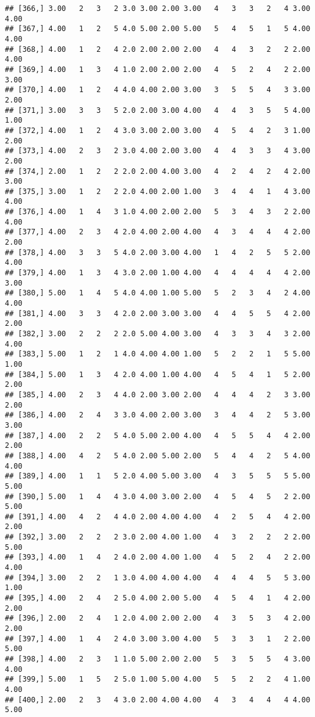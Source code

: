 \documentclass[]{article}
\begin{document}
\begin{verbatim}
## [366,] 3.00   2   3   2 3.0 3.00 2.00 3.00   4   3   3   2   4 3.00 4.00
## [367,] 4.00   1   2   5 4.0 5.00 2.00 5.00   5   4   5   1   5 4.00 4.00
## [368,] 4.00   1   2   4 2.0 2.00 2.00 2.00   4   4   3   2   2 2.00 4.00
## [369,] 4.00   1   3   4 1.0 2.00 2.00 2.00   4   5   2   4   2 2.00 3.00
## [370,] 4.00   1   2   4 4.0 4.00 2.00 3.00   3   5   5   4   3 3.00 2.00
## [371,] 3.00   3   3   5 2.0 2.00 3.00 4.00   4   4   3   5   5 4.00 1.00
## [372,] 4.00   1   2   4 3.0 3.00 2.00 3.00   4   5   4   2   3 1.00 2.00
## [373,] 4.00   2   3   2 3.0 4.00 2.00 3.00   4   4   3   3   4 3.00 2.00
## [374,] 2.00   1   2   2 2.0 2.00 4.00 3.00   4   2   4   2   4 2.00 3.00
## [375,] 3.00   1   2   2 2.0 4.00 2.00 1.00   3   4   4   1   4 3.00 4.00
## [376,] 4.00   1   4   3 1.0 4.00 2.00 2.00   5   3   4   3   2 2.00 4.00
## [377,] 4.00   2   3   4 2.0 4.00 2.00 4.00   4   3   4   4   4 2.00 2.00
## [378,] 4.00   3   3   5 4.0 2.00 3.00 4.00   1   4   2   5   5 2.00 4.00
## [379,] 4.00   1   3   4 3.0 2.00 1.00 4.00   4   4   4   4   4 2.00 3.00
## [380,] 5.00   1   4   5 4.0 4.00 1.00 5.00   5   2   3   4   2 4.00 4.00
## [381,] 4.00   3   3   4 2.0 2.00 3.00 3.00   4   4   5   5   4 2.00 2.00
## [382,] 3.00   2   2   2 2.0 5.00 4.00 3.00   4   3   3   4   3 2.00 4.00
## [383,] 5.00   1   2   1 4.0 4.00 4.00 1.00   5   2   2   1   5 5.00 1.00
## [384,] 5.00   1   3   4 2.0 4.00 1.00 4.00   4   5   4   1   5 2.00 2.00
## [385,] 4.00   2   3   4 4.0 2.00 3.00 2.00   4   4   4   2   3 3.00 2.00
## [386,] 4.00   2   4   3 3.0 4.00 2.00 3.00   3   4   4   2   5 3.00 3.00
## [387,] 4.00   2   2   5 4.0 5.00 2.00 4.00   4   5   5   4   4 2.00 2.00
## [388,] 4.00   4   2   5 4.0 2.00 5.00 2.00   5   4   4   2   5 4.00 4.00
## [389,] 4.00   1   1   5 2.0 4.00 5.00 3.00   4   3   5   5   5 5.00 5.00
## [390,] 5.00   1   4   4 3.0 4.00 3.00 2.00   4   5   4   5   2 2.00 5.00
## [391,] 4.00   4   2   4 4.0 2.00 4.00 4.00   4   2   5   4   4 2.00 2.00
## [392,] 3.00   2   2   2 3.0 2.00 4.00 1.00   4   3   2   2   2 2.00 5.00
## [393,] 4.00   1   4   2 4.0 2.00 4.00 1.00   4   5   2   4   2 2.00 4.00
## [394,] 3.00   2   2   1 3.0 4.00 4.00 4.00   4   4   4   5   5 3.00 1.00
## [395,] 4.00   2   4   2 5.0 4.00 2.00 5.00   4   5   4   1   4 2.00 2.00
## [396,] 2.00   2   4   1 2.0 4.00 2.00 2.00   4   3   5   3   4 2.00 2.00
## [397,] 4.00   1   4   2 4.0 3.00 3.00 4.00   5   3   3   1   2 2.00 5.00
## [398,] 4.00   2   3   1 1.0 5.00 2.00 2.00   5   3   5   5   4 3.00 4.00
## [399,] 5.00   1   5   2 5.0 1.00 5.00 4.00   5   5   2   2   4 1.00 4.00
## [400,] 2.00   2   3   4 3.0 2.00 4.00 4.00   4   3   4   4   4 4.00 5.00

\end{verbatim}
\end{document}
